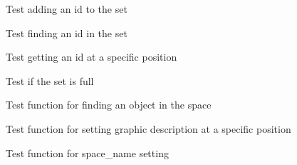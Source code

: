 \begin{DoxyRefList}
%
Test adding an id to the set  
\item[Global \doxylink{set__test_8c_a174af19b3c638e96c62c4b4c8282cb74}{test3\+\_\+set\+\_\+find} ()]\label{test__test000180}%
%
Test finding an id in the set  
\item[Global \doxylink{set__test_8c_a1fcf3e14365b8645d62ba1279eee06c2}{test3\+\_\+set\+\_\+get\+\_\+id\+\_\+at\+\_\+pos} ()]\label{test__test000177}%
%
Test getting an id at a specific position  
\item[Global \doxylink{set__test_8c_ac9078be0a2f086b649cb04e72065e6e3}{test3\+\_\+set\+\_\+is\+\_\+full} ()]\label{test__test000183}%
%
Test if the set is full  
\item[Global \doxylink{space__test_8c_a7275f3d4b2867f1b280a4238d5dbab72}{test3\+\_\+space\+\_\+find\+\_\+object} ()]\label{test__test000208}%
%
Test function for finding an object in the space  
\item[Global \doxylink{space__test_8c_a5edb257ba9ad878cd5ce94291b3402bf}{test3\+\_\+space\+\_\+set\+\_\+gdesc\+\_\+at} ()]\label{test__test000199}%
%
Test function for setting graphic description at a specific position  
\item[Global \doxylink{space__test_8c_aa24a337830006e33706ab6ac1c416b47}{test3\+\_\+space\+\_\+set\+\_\+name} ()]\label{test__test000188}%
%
Test function for space\+\_\+name setting 
\end{DoxyRefList}